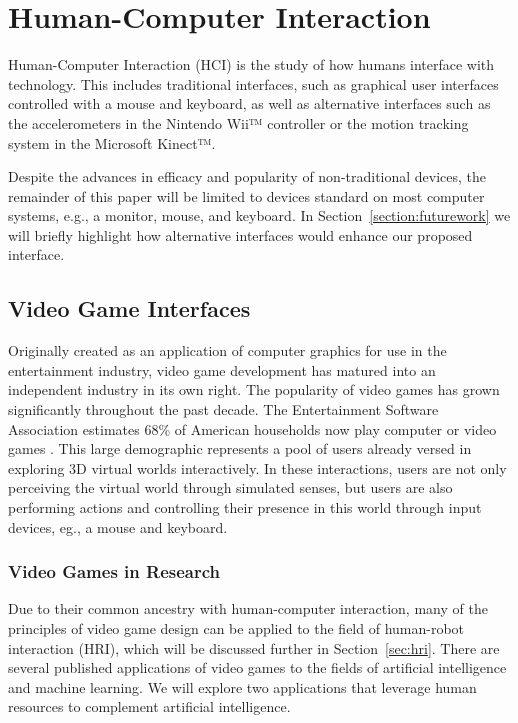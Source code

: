 \chapter{Human-Computer Interaction} %
\label{chapter:hci}
Human-Computer Interaction (HCI) is the study of how humans interface with technology. This includes traditional interfaces, such as graphical user interfaces controlled with a mouse and keyboard, as well as alternative interfaces such as the accelerometers in the Nintendo Wii™ controller or the motion tracking system in the Microsoft Kinect™.

Despite the advances in efficacy and popularity of non-traditional devices, the remainder of this paper will be limited to devices standard on most computer systems, e.g., a monitor, mouse, and keyboard. In Section~\ref{section:futurework} we will briefly highlight how alternative interfaces would enhance our proposed interface.

\section{Video Game Interfaces} %
\label{sec:video_game_interfaces}
Originally created as an application of computer graphics for use in the entertainment industry, video game development has matured into an independent industry in its own right. The popularity of video games has grown significantly throughout the past decade. The Entertainment Software Association estimates 68\% of American households now play computer or video games \cite{ESA}. This large demographic represents a pool of users already versed in exploring 3D virtual worlds interactively. In these interactions, users are not only perceiving the virtual world through simulated senses, but users are also performing actions and controlling their presence in this world through input devices, eg., a mouse and keyboard.

\subsection{Video Games in Research} %
\label{sub:video_games_in_research}
Due to their common ancestry with human-computer interaction, many of the principles of video game design can be applied to the field of human-robot interaction (HRI), which will be discussed further in Section~\ref{sec:hri}. There are several published applications of video games to the fields of artificial intelligence and machine learning. We will explore two applications that leverage human resources to complement artificial intelligence.

